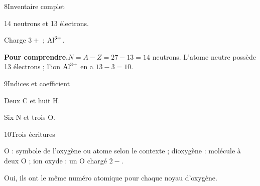 \par\noindent\begin{minipage}{\linewidth}
\begin{corrige}{8}{Inventaire complet}
\begin{questions}
\item 14 neutrons et 13 électrons.
\item Charge $3+$ ; $\ce{Al^{3+}}$.
\end{questions}
\par\smallskip\noindent\textbf{Pour comprendre.}\enspace $N=A-Z=27-13=14$ neutrons. L’atome neutre possède 13 électrons ; l’ion $\ce{Al^3+}$ en a $13-3=10$.\par
{}
\end{corrige}
\end{minipage}
\par\noindent\begin{minipage}{\linewidth}
\begin{corrige}{9}{Indices et coefficient}
\begin{questions}
\item Deux C et huit H.
\item Six N et trois O.
\end{questions}
\end{corrige}
\end{minipage}
\par\noindent\begin{minipage}{\linewidth}
\begin{corrige}{10}{Trois écritures}
\begin{questions}
\item O : symbole de l’oxygène ou atome selon le contexte ; dioxygène : molécule à deux O ; ion oxyde : un O chargé $2-$.
\item Oui, ils ont le même numéro atomique pour chaque noyau d’oxygène.
\end{questions}
\end{corrige}
\end{minipage}
